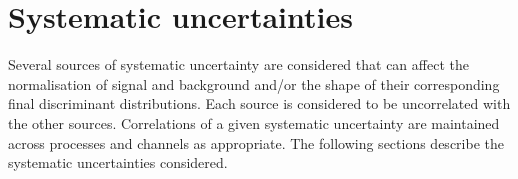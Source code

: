 \section{Systematic uncertainties}
\label{sec:systematics}
				   
Several sources of systematic uncertainty are considered that can affect the normalisation of signal 
and background and/or the shape of their corresponding final discriminant distributions.  
Each source is considered to be uncorrelated with the other sources.  
Correlations of a given systematic uncertainty are maintained across processes and channels 
as appropriate.
The following sections describe the systematic uncertainties considered.

